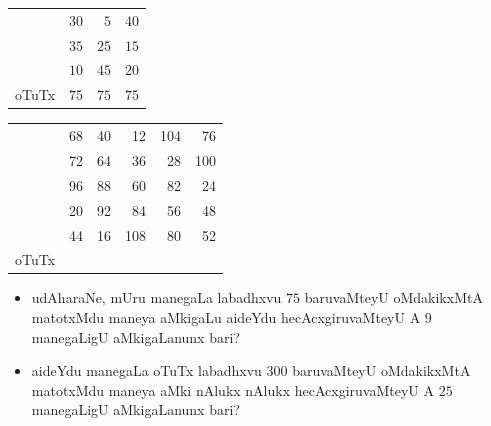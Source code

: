 \begin{minipage}[c]{5cm}
\begin{center}
\renewcommand{\arraystretch}{1.2}
\begin{tabular}{c|r|r|r|}
\cline{2-4}
& $30$ & $5$ & $40$\\
\cline{2-4}
& $35$ & $25$ & $15$\\
\cline{2-4}
& $10$ & $45$ & $20$\\
\cline{2-4}
\multicolumn{1}{c}{oTuTx} & \multicolumn{1}{r}{$75$} & \multicolumn{1}{r}{$75$}
& \multicolumn{1}{r}{$75$} 
\end{tabular}
\end{center}
\end{minipage}
\qquad
\begin{minipage}[c]{5cm}
\begin{center}
\renewcommand{\arraystretch}{1.2}
\begin{tabular}{c|>{\rm}r|>{\rm}r|>{\rm}r|>{\rm}r|>{\rm}r|}
\cline{2-6}
 & 68 & 40 & 12 & 104 & 76\\
\cline{2-6}
 & 72 & 64 & 36 & 28 & 100\\
\cline{2-6}
 & 96 & 88 & 60 & 82 & 24\\
\cline{2-6}
& 20 & 92 & 84 & 56 & 48\\
\cline{2-6}
& 44 & 16 & 108 & 80 & 52\\ 
\cline{2-6}
\multicolumn{1}{c}{oTuTx} & \multicolumn{1}{r}{$300$}
& \multicolumn{1}{r}{$300$} & \multicolumn{1}{r}{$300$}
& \multicolumn{1}{r}{$300$} & \multicolumn{1}{r}{$300$} 
\end{tabular}
\end{center}
\end{minipage}

\begin{itemize}
\item[\rm(1)] udAharaNe, mUru manegaLa labadhxvu $75$ baruvaMteyU
oMdakikxMtA matotxMdu maneya aMkigaLu aideYdu hecAcxgiruvaMteyU A $9$
manegaLigU aMkigaLanunx bari?

\item[\rm(2)] aideYdu manegaLa oTuTx labadhxvu $300$ baruvaMteyU
oMdakikxMtA matotxMdu maneya aMki nAlukx nAlukx hecAcxgiruvaMteyU A
$25$ manegaLigU aMkigaLanunx bari?
\end{itemize}


